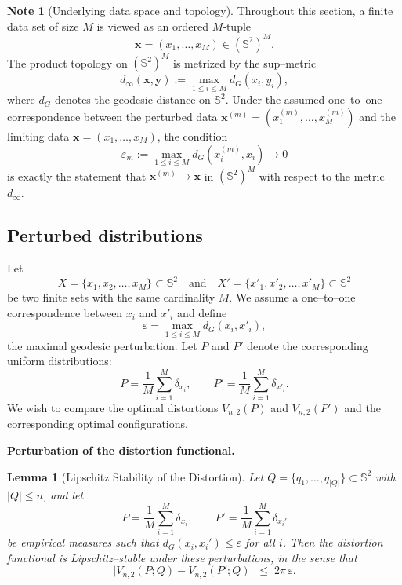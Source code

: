 \documentclass[12pt, reqno]{amsart}
\theoremstyle{plain}
\newtheorem{lemma}[subsection]{Lemma}
\theoremstyle{definition}
\newtheorem{note}[subsection]{Note}
\newcommand{\D}[1]{\mathbb{#1}}%
\begin{document}
\begin{note}[Underlying data space and topology]
Throughout this section, a finite data set of size $M$ is viewed as an ordered
$M$-tuple
\[
\mathbf{x}=(x_1,\dots,x_M)\in (\D S^2)^M.
\]
The product topology on $(\D S^2)^M$ is metrized by the sup--metric
\[
d_\infty(\mathbf{x},\mathbf{y})
:= \max_{1\le i\le M} d_G(x_i,y_i),
\]
where $d_G$ denotes the geodesic distance on $\D S^2$.
Under the assumed one--to--one correspondence between the perturbed data
$\mathbf{x}^{(m)}=(x^{(m)}_1,\dots,x^{(m)}_M)$ and the limiting data
$\mathbf{x}=(x_1,\dots,x_M)$, the condition
\[
\varepsilon_m := \max_{1\le i\le M} d_G(x^{(m)}_i,x_i)\to 0
\]
is exactly the statement that $\mathbf{x}^{(m)}\to\mathbf{x}$ in
$(\D S^2)^M$ with respect to the metric $d_\infty$.
\end{note}

\medskip

\subsection{Perturbed distributions}
Let
\[
 {X} = \{ {x}_1,  {x}_2, \ldots,  {x}_M\} \subset \D S^2
\quad \text{and} \quad
 {X}' = \{ {x}'_1,  {x}'_2, \ldots,  {x}'_M\} \subset \D S^2
\]
be two finite sets with the same cardinality $M$. We assume a one--to--one correspondence between
$ {x}_i$ and $ {x}'_i$ and define
\[
\varepsilon = \max_{1 \le i \le M} d_G( {x}_i,  {x}'_i),
\]
the maximal geodesic perturbation. Let $P$ and $P'$ denote the corresponding uniform distributions:
\[
P = \frac{1}{M} \sum_{i=1}^M \delta_{ {x}_i},
\qquad
P' = \frac{1}{M} \sum_{i=1}^M \delta_{ {x}'_i}.
\]
We wish to compare the optimal distortions $V_{n,2}(P)$ and $V_{n,2}(P')$ and the corresponding optimal
configurations.

\medskip

\noindent\textbf{Perturbation of the distortion functional.}

 

\begin{lemma}[Lipschitz Stability of the Distortion]\label{lem:distortion-stability}
Let $Q=\{q_1,\dots,q_{|Q|}\}\subset\mathbb{S}^2$ with $|Q|\le n$, and let
\[
P=\frac1M\sum_{i=1}^M \delta_{x_i},\qquad
P'=\frac1M\sum_{i=1}^M \delta_{x_i'}
\]
be empirical measures such that $d_G(x_i,x_i')\le \varepsilon$ for all $i$.
Then the distortion functional is Lipschitz–stable under these perturbations, in the sense that
\[
\bigl|V_{n,2}(P;Q)-V_{n,2}(P';Q)\bigr|\;\le\;2\pi\,\varepsilon.
\]
\end{lemma}
\end{document}

